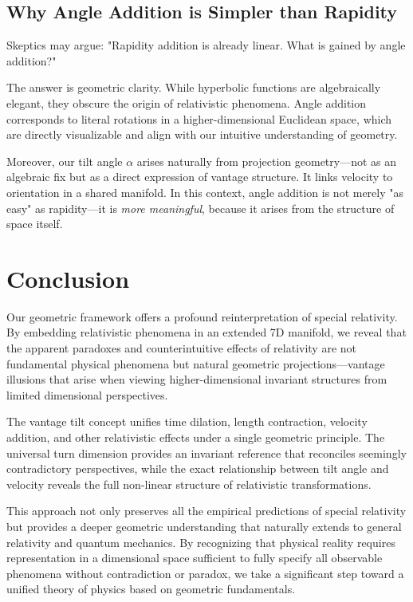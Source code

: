 \documentclass{article}
\begin{document}
\subsection{Why Angle Addition is Simpler than Rapidity}

Skeptics may argue: "Rapidity addition is already linear. What is gained by angle addition?"

The answer is geometric clarity. While hyperbolic functions are algebraically elegant, they obscure the origin of relativistic phenomena. Angle addition corresponds to literal rotations in a higher-dimensional Euclidean space, which are directly visualizable and align with our intuitive understanding of geometry.

Moreover, our tilt angle $\alpha$ arises naturally from projection geometry---not as an algebraic fix but as a direct expression of vantage structure. It links velocity to orientation in a shared manifold. In this context, angle addition is not merely "as easy" as rapidity---it is \textit{more meaningful}, because it arises from the structure of space itself.

\section{Conclusion}

Our geometric framework offers a profound reinterpretation of special relativity. By embedding relativistic phenomena in an extended 7D manifold, we reveal that the apparent paradoxes and counterintuitive effects of relativity are not fundamental physical phenomena but natural geometric projections---vantage illusions that arise when viewing higher-dimensional invariant structures from limited dimensional perspectives.

The vantage tilt concept unifies time dilation, length contraction, velocity addition, and other relativistic effects under a single geometric principle. The universal turn dimension provides an invariant reference that reconciles seemingly contradictory perspectives, while the exact relationship between tilt angle and velocity reveals the full non-linear structure of relativistic transformations.

This approach not only preserves all the empirical predictions of special relativity but provides a deeper geometric understanding that naturally extends to general relativity and quantum mechanics. By recognizing that physical reality requires representation in a dimensional space sufficient to fully specify all observable phenomena without contradiction or paradox, we take a significant step toward a unified theory of physics based on geometric fundamentals.
\end{document}
